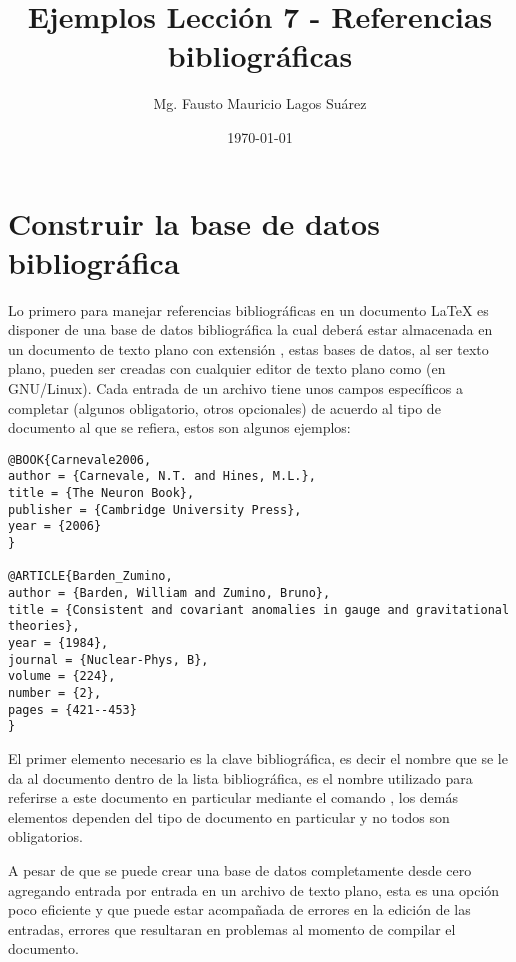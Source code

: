 \documentclass[10pt,a4paper]{article}
\title{Ejemplos Lección 7 - Referencias bibliográficas}
\author{Mg. Fausto Mauricio Lagos Suárez}
\date{\today}
\begin{document}
\maketitle
\renewcommand{\refname}{Bibliografía} %
\renewcommand{\contentsname}{Tabla de Contenido}

\tableofcontents

\section{Construir la base de datos bibliográfica}

Lo primero para manejar referencias bibliográficas en un documento \LaTeX{} es disponer de una base de datos bibliográfica la cual deberá estar almacenada en un documento de texto plano con extensión , estas bases de datos, al ser texto plano, pueden ser creadas con cualquier editor de texto plano como  (en GNU/Linux). Cada entrada de un archivo  tiene unos campos específicos a completar (algunos obligatorio, otros opcionales) de acuerdo al tipo de documento al que se refiera, estos son algunos ejemplos:

\begin{verbatim}
@BOOK{Carnevale2006,
author = {Carnevale, N.T. and Hines, M.L.},
title = {The Neuron Book},
publisher = {Cambridge University Press},
year = {2006}
}

@ARTICLE{Barden_Zumino, 
author = {Barden, William and Zumino, Bruno},
title = {Consistent and covariant anomalies in gauge and gravitational theories},
year = {1984},
journal = {Nuclear-Phys, B},
volume = {224},
number = {2},
pages = {421--453}
}
\end{verbatim}

El primer elemento necesario es la clave bibliográfica, es decir el nombre que se le da al documento dentro de la lista bibliográfica, es el nombre utilizado para referirse a este documento en particular mediante el comando , los demás elementos dependen del tipo de documento en particular y no todos son obligatorios.

A pesar de que se puede crear una base de datos  completamente desde cero agregando entrada por entrada en un archivo de texto plano, esta es una opción poco eficiente y que puede estar acompañada de errores en la edición de las entradas, errores que resultaran en problemas al momento de compilar el documento.
\end{document}
